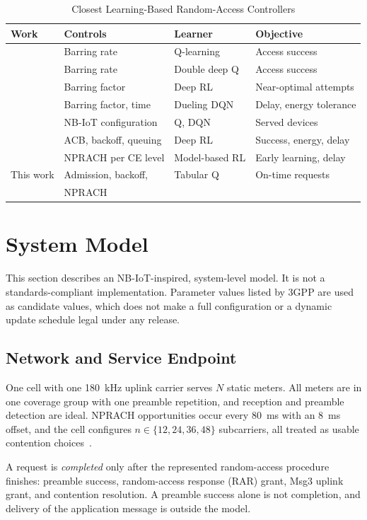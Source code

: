 \documentclass[conference]{IEEEtran}
\begin{document}
\begin{table}[!t]
\caption{Closest Learning-Based Random-Access Controllers}
\label{tab:related}
\centering
\begin{tabular}{@{}l l l l@{}}
\hline
\textbf{Work} & \textbf{Controls} & \textbf{Learner} & \textbf{Objective} \\
\hline
\cite{tello} & Barring rate & Q-learning & Access success \\
\cite{pacheco} & Barring rate & Double deep Q & Access success \\
\cite{hadjadj} & Barring factor & Deep RL & Near-optimal attempts \\
\cite{bui} & Barring factor, time & Dueling DQN & Delay, energy tolerance \\
\cite{jiang19} & NB-IoT configuration & Q, DQN & Served devices \\
\cite{jiang21} & ACB, backoff, queuing & Deep RL & Success, energy, delay \\
\cite{alcaraz} & NPRACH per CE level & Model-based RL & Early learning, delay \\
This work & Admission, backoff, & Tabular Q & On-time requests \\
 & NPRACH & & \\
\hline
\end{tabular}
\end{table}

\section{System Model}
\label{sec:model}
This section describes an NB-IoT-inspired, system-level model. It is not a
standards-compliant implementation. Parameter values listed by 3GPP are used as
candidate values, which does not make a full configuration or a dynamic update
schedule legal under any release.

\subsection{Network and Service Endpoint}
One cell with one 180~kHz uplink carrier serves $N$ static meters. All meters are
in one coverage group with one preamble repetition, and reception and preamble
detection are ideal. NPRACH opportunities occur every 80~ms with an 8~ms offset,
and the cell configures $n \in \{12, 24, 36, 48\}$ subcarriers, all treated as
usable contention choices~\cite{ts36331}.

A request is \emph{completed} only after the represented random-access procedure
finishes: preamble success, random-access response (RAR) grant, Msg3 uplink grant,
and contention resolution. A preamble success alone is not completion, and
delivery of the application message is outside the model.
\end{document}
